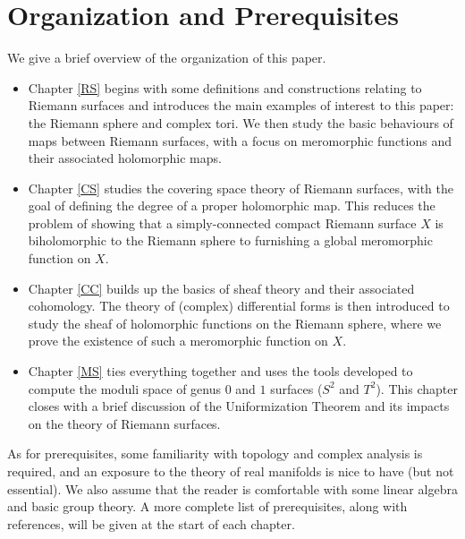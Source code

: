 \documentclass[../Moduli_Spaces_of_Riemann_Surfaces.tex]{subfiles}
\begin{document}
    \section{Organization and Prerequisites}
    We give a brief overview of the organization of this paper.
    \begin{itemize}
        \item Chapter \ref{RS} begins with some definitions and constructions relating to Riemann surfaces and introduces the main examples of interest to this paper: the Riemann sphere and complex tori. We then study the basic behaviours of maps between Riemann surfaces, with a focus on meromorphic functions and their associated holomorphic maps.
            \vspace{-0.05in}
        \item Chapter \ref{CS} studies the covering space theory of Riemann surfaces, with the goal of defining the degree of a proper holomorphic map. This reduces the problem of showing that a simply-connected compact Riemann surface $X$ is biholomorphic to the Riemann sphere to furnishing a global meromorphic function on $X$.
            \vspace{-0.05in}
        \item Chapter \ref{CC} builds up the basics of sheaf theory and their associated cohomology. The theory of (complex) differential forms is then introduced to study the sheaf of holomorphic functions on the Riemann sphere, where we prove the existence of such a meromorphic function on $X$.
            \vspace{-0.05in}
        \item Chapter \ref{MS} ties everything together and uses the tools developed to compute the moduli space of genus $0$ and $1$ surfaces ($S^2$ and $T^2$). This chapter closes with a brief discussion of the Uniformization Theorem and its impacts on the theory of Riemann surfaces.
    \end{itemize}
    As for prerequisites, some familiarity with topology and complex analysis is required, and an exposure to the theory of real manifolds is nice to have (but not essential). We also assume that the reader is comfortable with some linear algebra and basic group theory. A more complete list of prerequisites, along with references, will be given at the start of each chapter.
\end{document}
